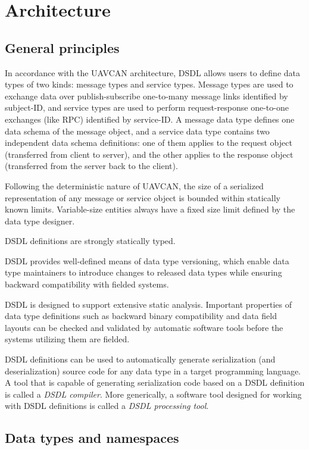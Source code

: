\section{Architecture}

\subsection{General principles}

In accordance with the UAVCAN architecture, DSDL allows users to define data types of two kinds:
message types and service types.
Message types are used to exchange data over publish-subscribe one-to-many message links identified by subject-ID,
and service types are used to perform request-response one-to-one exchanges (like RPC) identified by service-ID.
A message data type defines one data schema of the message object,
and a service data type contains two independent data schema definitions:
one of them applies to the request object (transferred from client to server),
and the other applies to the response object (transferred from the server back to the client).

Following the deterministic nature of UAVCAN, the size of a serialized representation of any
message or service object is bounded within statically known limits.
Variable-size entities always have a fixed size limit defined by the data type designer.

DSDL definitions are strongly statically typed.

DSDL provides well-defined means of data type versioning, which enable data type maintainers to introduce changes
to released data types while ensuring backward compatibility with fielded systems.

DSDL is designed to support extensive static analysis. Important properties of data type definitions such as
backward binary compatibility and data field layouts can be checked and validated by automatic software tools
before the systems utilizing them are fielded.

DSDL definitions can be used to automatically generate serialization (and deserialization) source code
for any data type in a target programming language.
A tool that is capable of generating serialization code based on a DSDL definition is called a \emph{DSDL compiler}.
More generically, a software tool designed for working with DSDL definitions is called a
\emph{DSDL processing tool}.

\subsection{Data types and namespaces}

